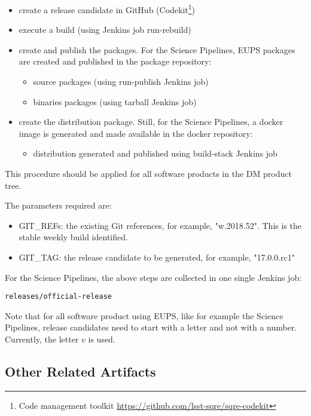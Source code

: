 \begin{itemize}
\item create a release candidate in GitHub (Codekit\footnote{Code management toolkit \url{https://github.com/lsst-sqre/sqre-codekit}})
\item execute a build (using Jenkins job run-rebuild)
\item create and publish the packages. For the Science Pipelines, EUPS packages are created and published in the package repository:
   \begin{itemize}
   \item source packages (using run-publish Jenkins job)
   \item binaries packages (using tarball Jenkins job)
   \end{itemize}
\item create the distribution package. Still, for the Science Pipelines, a docker image is generated and made available in the docker repository:
   \begin{itemize}
   \item distribution generated and published using build-stack Jenkins job
   \end{itemize}
\end{itemize}


This procedure should be applied for all software products in the DM product tree.

The parameters required are:
\begin{itemize}
\item GIT\_REFs: the existing Git references, for example, "w.2018.52". This is the stable weekly build identified.
\item GIT\_TAG: the release candidate to be generated, for example, "17.0.0.rc1"
\end{itemize}

For the Science Pipelines, the above steps are collected in one single Jenkins job:

\begin{verbatim}
releases/official-release
\end{verbatim}

Note that for all software product using EUPS, like for example the Science Pipelines, release candidates need to start with a letter and not with a number.
Currently, the letter $v$ is used.


\subsection{Other Related Artifacts}

